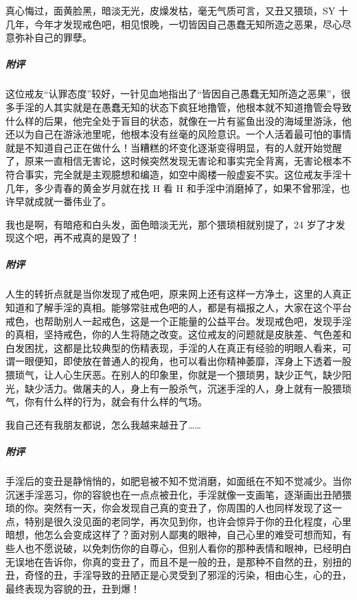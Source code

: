 \begin{case}[变丑]
    真心悔过，面黄脸黑，暗淡无光，皮燥发枯，毫无气质可言，又丑又猥琐，SY 十几年，今年才发现戒色吧，相见恨晚，一切皆因自己愚蠢无知所造之恶果，尽心尽意弥补自己的罪孽。
    \subparagraph{附评} 这位戒友“认罪态度”较好，一针见血地指出了“皆因自己愚蠢无知所造之恶果”，很多手淫的人其实就是在愚蠢无知的状态下疯狂地撸管，他根本就不知道撸管会导致什么样的后果，他完全处于盲目的状态，就像在一片有鲨鱼出没的海域里游泳，他还以为自己在游泳池里呢，他根本没有丝毫的风险意识。一个人活着最可怕的事情就是不知道自己正在做什么！当糟糕的坏变化逐渐变得明显，有的人就开始觉醒了，原来一直相信无害论，这时候突然发现无害论和事实完全背离，无害论根本不符合事实，完全就是主观臆想和编造，如空中阁楼一般虚妄不实。这位戒友手淫十几年，多少青春的黄金岁月就在找 H 看 H 和手淫中消磨掉了，如果不曾邪淫，也许早就成就一番伟业了。
\end{case}

\begin{case}[变丑]
    我也是啊，有暗疮和白头发，面色暗淡无光，那个猥琐相就别提了，24 岁了才发现这个吧，再不戒真的是毁了！
    \subparagraph{附评} 人生的转折点就是当你发现了戒色吧，原来网上还有这样一方净土，这里的人真正知道和了解手淫的真相。能够常驻戒色吧的人，都是有福报之人，大家在这个平台戒色，也帮助别人一起戒色，这是一个正能量的公益平台。发现戒色吧，发现手淫的真相，坚持戒色，你的人生将随之改变。这位戒友的问题就是皮肤差、气色差和白发困扰，这都是比较典型的伤精表现，手淫的人在真正有经验的明眼人看来，可谓一眼便知，即使放在普通人的视角，也可以看出你精神萎靡，浑身上下透着一股猥琐气，让人心生厌恶。在别人的印象里，你就是一个猥琐男，缺少正气，缺少阳光，缺少活力。做屠夫的人，身上有一股杀气，沉迷手淫的人，身上就有一股猥琐气，你有什么样的行为，就会有什么样的气场。
\end{case}

\begin{case}[变丑]
    我自己还有我朋友都说，怎么我越来越丑了……
    \subparagraph{附评} 手淫后的变丑是静悄悄的，如肥皂被不知不觉消磨，如面纸在不知不觉减少。当你沉迷手淫恶习，你的容貌也在一点点被丑化，手淫就像一支画笔，逐渐画出丑陋猥琐的你。突然有一天，你会发现自己真的变丑了，你周围的人也同样发现了这一点，特别是很久没见面的老同学，再次见到你，也许会惊异于你的丑化程度，心里暗想，他怎么会变成这样了？面对别人鄙夷的眼神，自己心里的难受可想而知，有些人也不愿说破，以免刺伤你的自尊心，但别人看你的那种表情和眼神，已经明白无误地在告诉你，你真的变丑了，而且不是一般的丑，是那种不自然的丑，别扭的丑，奇怪的丑，手淫导致的丑陋正是心灵受到了邪淫的污染，相由心生，心的丑，最终表现为容貌的丑，丑到爆！
\end{case}

